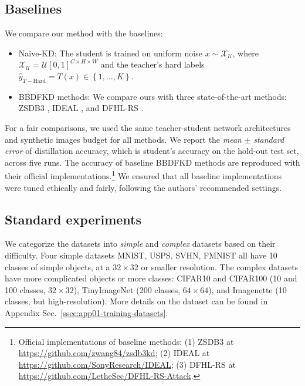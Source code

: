 \subsection{Baselines} \label{ssec:04-experiments-baselines}
\begin{foldable} %
    We compare our method {\methodname} with the baselines:
    \begin{itemize}
        \item Naive-KD: The student is trained on uniform noise $x\sim\mathcal{X_{\mathcal{U}}}$, where $\mathcal{X}_{\mathcal{U}}=\mathcal{U}\left[0,1\right]^{C\times H\times W}$ and the teacher's hard labels $\hat{y}_{T-\text{Hard}}=T\left(x\right)\in\left\{ 1,\ldots,K\right\}$.
        \item BBDFKD methods: We compare ours with three state-of-the-art methods: ZSDB3 \citep{wang2021zero}, IDEAL \citep{zhang2022ideal}, and DFHL-RS \citep{yuan2024data}.
    \end{itemize}
    For a fair comparisons, we used the same teacher-student network architectures and synthetic images budget for all methods.
    We report the \textit{mean} $\pm$ \textit{standard error} of distillation accuracy, which is student's accuracy on the hold-out test set, across five runs.
    The accuracy of baseline BBDFKD methods are reproduced with their official implementations.\footnote{Official implementations of baseline methods: (1) ZSDB3 at \url{https://github.com/zwang84/zsdb3kd}; (2) IDEAL at \url{https://github.com/SonyResearch/IDEAL}; (3) DFHL-RS at \url{https://github.com/LetheSec/DFHL-RS-Attack}.}
    We ensured that all baseline implementations were tuned ethically and fairly, following the authors' recommended settings.
\end{foldable}


\subsection{Standard experiments} \label{ssec:04-experiments-standard}
\begin{foldable} %
    We categorize the datasets into \textit{simple} and \textit{complex} datasets based on their difficulty.
    Four simple datasets MNIST, USPS, SVHN, FMNIST all have 10 classes of simple objects, at a $32\times32$ or smaller resolution.
    The complex datasets have more complicated objects or more classes: CIFAR10 and CIFAR100 (10 and 100 classes, $32\times32$), TinyImageNet (200 classes, $64\times64$), and Imagenette (10 classes, but high-resolution).
    More details on the dataset can be found in Appendix Sec.~\ref{ssec:app01-training-datasets}.
\end{foldable}


